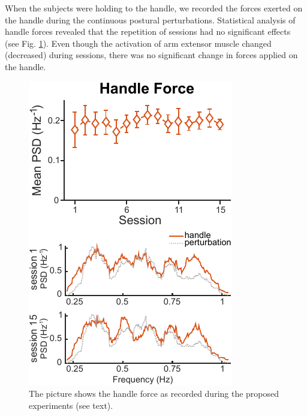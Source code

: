 When the subjects were holding to the handle, we recorded the forces exerted on the handle during the continuous postural perturbations. Statistical analysis of handle forces revealed that the repetition of sessions had no significant effects (see Fig. \ref{fig:HandleForces}). Even though the activation of arm extensor muscle changed (decreased) during sessions, there was no significant change in forces applied on the handle.

\begin{figure}[!t]
	\begin{center}
		\includegraphics[width=\linewidth]{images/HandleForce-all.pdf}
		\caption{The picture shows the handle force as recorded during the proposed experiments (see text).}
		\label{fig:HandleForces}
	\end{center}
\end{figure}



